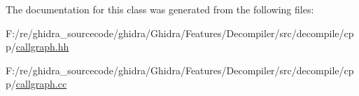 The documentation for this class was generated from the following files\+:\begin{DoxyCompactItemize}
\item 
F\+:/re/ghidra\+\_\+sourcecode/ghidra/\+Ghidra/\+Features/\+Decompiler/src/decompile/cpp/\mbox{\hyperlink{callgraph_8hh}{callgraph.\+hh}}\item 
F\+:/re/ghidra\+\_\+sourcecode/ghidra/\+Ghidra/\+Features/\+Decompiler/src/decompile/cpp/\mbox{\hyperlink{callgraph_8cc}{callgraph.\+cc}}\end{DoxyCompactItemize}
